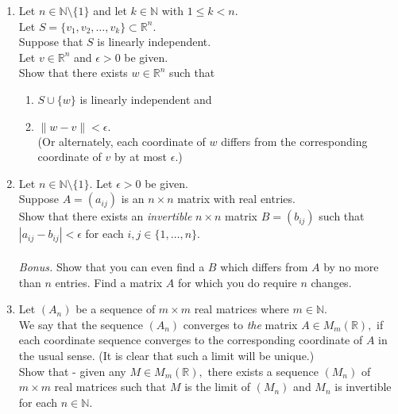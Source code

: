 \documentclass[12pt]{article}
\begin{document}
\begin{enumerate}[leftmargin=*]
	\item Let $n \in \mathbb{N}\setminus\{1\}$ and let $k \in \mathbb{N}$ with $1 \le k < n.$\\
	Let $S = \{v_1, v_2,\ldots, v_k\} \subset \mathbb{R}^n.$\\
	Suppose that $S$ is linearly independent.\\
	Let $v \in \mathbb{R}^n$ and $\epsilon > 0$ be given. \\
	Show that there exists $w \in \mathbb{R}^n$ such that 
	\begin{enumerate}[nosep] 
		\item $S\cup\{w\}$ is linearly independent and 
		\item $\|w - v\| < \epsilon.$\\
		(Or alternately, each coordinate of $w$ differs from the corresponding coordinate of $v$ by at most $\epsilon.$)
	\end{enumerate}
	\item Let $n \in \mathbb{N}\setminus\{1\}.$ Let $\epsilon > 0$ be given.\\
	Suppose $A = (a_{ij})$ is an $n \times n$ matrix with real entries.\\
	Show that there exists an \emph{invertible} $n \times n$ matrix $B = (b_{ij})$ such that $|a_{ij} - b_{ij}| < \epsilon$ for each $i, j \in \{1, \ldots, n\}.$\\~\\
	\emph{Bonus.} Show that you can even find a $B$ which differs from $A$ by no more than $n$ entries. Find a matrix $A$ for which you do require $n$ changes.
	\item Let $(A_n)$ be a sequence of $m\times m$ real matrices where $m \in \mathbb{N}.$\\
	We say that the sequence $(A_n)$ converges to \emph{the} matrix $A \in M_m(\mathbb{R}),$ if each coordinate sequence converges to the corresponding coordinate of $A$ in the usual sense. (It is clear that such a limit will be unique.)\\
	Show that - given any $M \in M_m(\mathbb{R}),$ there exists a sequence $(M_n)$ of $m\times m$ real matrices such that $M$ is the limit of $(M_n)$ and $M_n$ is invertible for each $n \in \mathbb{N}.$


\end{enumerate}
\end{document}
